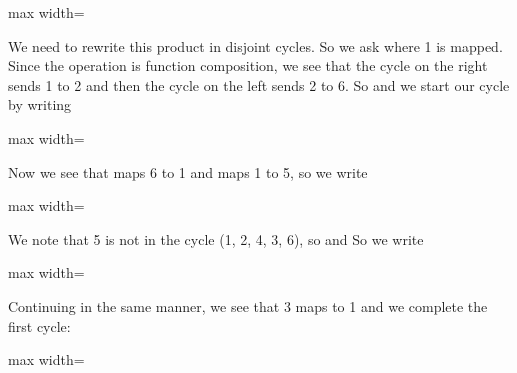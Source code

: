 \documentclass[11pt,oneside]{article}
\begin{document}
\begin{BookBody}
\begin{center}\begin{adjustbox}{max width=\linewidth}\end{adjustbox}\end{center}

\noindent We need to rewrite this product in disjoint cycles. So we ask where 1 is mapped. Since the operation is function composition, we see that the cycle \BookInline{\tau } on the right sends 1 to 2 and then the cycle on the left sends 2 to 6. So  and we start our cycle by writing

\begin{center}\begin{adjustbox}{max width=\linewidth}\end{adjustbox}\end{center}

\noindent Now we see that \BookInline{\tau } maps 6 to 1 and \BookInline{\sigma } maps 1 to 5, so we write

\begin{center}\begin{adjustbox}{max width=\linewidth}\end{adjustbox}\end{center}

\noindent We note that 5 is not in the cycle (1, 2, 4, 3, 6), so  and  So we write

\begin{center}\begin{adjustbox}{max width=\linewidth}\end{adjustbox}\end{center}

\noindent Continuing in the same manner, we see that 3 maps to 1 and we complete the first cycle:

\begin{center}\begin{adjustbox}{max width=\linewidth}\end{adjustbox}\end{center}


\end{BookBody}
\end{document}

